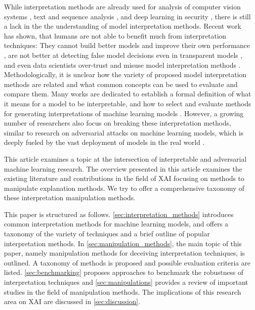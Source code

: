 While interpretation methods are already used for analysis of computer vision systems \cite{bach2015pixel, simonyan2013deep, zeiler2014visualizing}, text and sequence analysis \cite{ancona2017towards, arras2017relevant}, and deep learning in security \cite{evaluating_explanations_security}, there is still a lack in the the understanding of model interpretation methods. 
Recent work has shown, that humans are not able to benefit much from interpretation techniques: They cannot build better models and improve their own performance \cite{hase2020evaluating}, are not better at detecting false model decisions even in transparent models \cite{poursabzi2018manipulating}, and even data scientists over-trust and misuse model interpretation methods \cite{kaur2020interpreting}. 
Methodologically, it is unclear how the variety of proposed model interpretation methods are related and what common concepts can be used to evaluate and compare them. Many works are dedicated to establish a formal definition of what it means for a model to be interpretable, and how to select and evaluate methods for generating interpretations of machine learning models \cite{murdoch2019definitions, lipton2018mythos}. However, a growing number of researchers also focus on breaking these interpretation methods, similar to research on adversarial attacks on machine learning models, which is deeply fueled by the vast deployment of models in the real world \cite{fooling_nn_interpreters,ghorbani2019interpretation,dimanov2020you,dombrowski2019explanations,advlime_aies20, le2020remote, zhang2020interpretable, kuppa2020black, anders2020fairwashing, lakkaraju2020fool, kindermans2017reliability}.

\newline
This article examines a topic at the intersection of interpretable and adversarial machine learning research. 
The overview presented in this article examines the existing literature and contributions in the field of XAI focusing on methods to manipulate explanation methods. We try to offer a comprehensive taxonomy of these interpretation manipulation methods. 

This paper is structured as follows. \autoref{sec:interpretation_methods} introduces common interpretation methods for machine learning models, and offers a taxonomy of the variety of techniques and a brief outline of popular interpretation methods.
In \autoref{sec:manipulation_methods}, the main topic of this paper, namely manipulation methods for deceiving interpretation techniques, is outlined. A taxonomy of methods is proposed and possible evaluation criteria are listed. \autoref{sec:benchmarking} proposes approaches to benchmark the robustness of interpretation techniques and \autoref{sec:manipulations} provides a review of important studies in the field of manipulation methods. The implications of this research area on XAI are discussed in \autoref{sec:discussion}.
